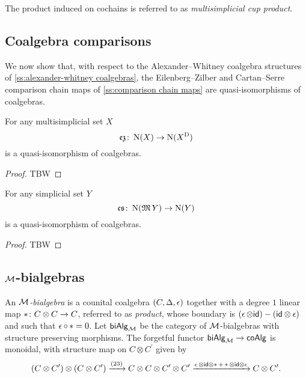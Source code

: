 The product induced on cochains is referred to as \textit{multisimplicial cup product}.

\subsection{Coalgebra comparisons}

We now show that, with respect to the Alexander--Whitney coalgebra structures of \cref{ss:alexander-whitney coalgebras}, the Eilenberg--Zilber and Cartan--Serre comparison chain maps of \cref{ss:comparison chain maps} are quasi-isomorphisms of coalgebras.

\begin{theorem}
	For any multisimplicial set $X$
	\[
	\operatorname{\mathfrak{ez}} \colon \operatorname{N}(X) \to \operatorname{N}(X^{\mathrm{D}})
	\]
	is a quasi-isomorphism of coalgebras.
\end{theorem}

\begin{proof}
	TBW 
\end{proof}

\begin{theorem}
	For any simplicial set $Y$
	\[
	\operatorname{\mathfrak{cs}} \colon \operatorname{N}(\operatorname{\mathfrak{M}} Y) \to \operatorname{N}(Y)
	\]
	is a quasi-isomorphism of coalgebras.
\end{theorem}

\begin{proof}
	TBW 
\end{proof}

\subsection{$\mathcal{M}$-bialgebras}

An \textit{$\mathcal{M}$-bialgebra} is a counital coalgebra $(C, \operatorname{\Delta}, \operatorname{\epsilon})$ together with a degree $1$ linear map $\operatorname{\ast} \colon C \otimes C \to C$, referred to as \textit{product}, whose boundary is $(\operatorname{\epsilon} \otimes \mathsf{id}) - (\mathsf{id} \otimes \operatorname{\epsilon})$ and such that $\operatorname{\epsilon} \circ \operatorname{\ast} = 0$.
Let $\mathsf{biAlg}_{\mathcal{M}}$ be the category of $\mathcal{M}$-bialgebras with structure preserving morphisms.
The forgetful functor $\mathsf{biAlg}_{\mathcal{M}} \to \mathsf{coAlg}$ is monoidal, with structure map on $C \otimes C^\prime$ given by
\[
(C \otimes C^\prime) \otimes (C \otimes C^\prime) \xrightarrow{(23)}
C \otimes C \otimes C^\prime \otimes C^\prime
\xrightarrow{\operatorname{\epsilon} \otimes \mathsf{id} \otimes \operatorname{\ast} + \operatorname{\ast} \otimes \mathsf{id} \otimes \operatorname{\epsilon}}
C \otimes C^\prime.
\]

